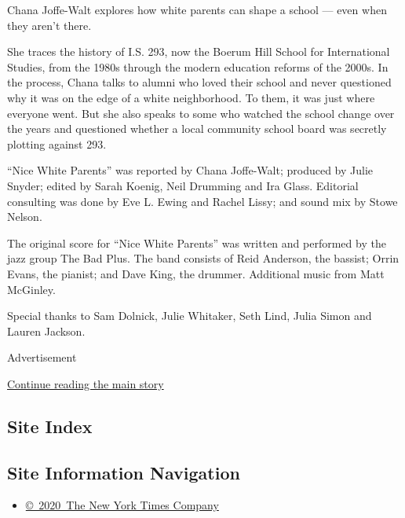 Chana Joffe-Walt explores how white parents can shape a school --- even
when they aren't there.

She traces the history of I.S. 293, now the Boerum Hill School for
International Studies, from the 1980s through the modern education
reforms of the 2000s. In the process, Chana talks to alumni who loved
their school and never questioned why it was on the edge of a white
neighborhood. To them, it was just where everyone went. But she also
speaks to some who watched the school change over the years and
questioned whether a local community school board was secretly plotting
against 293.

``Nice White Parents'' was reported by Chana Joffe-Walt; produced by
Julie Snyder; edited by Sarah Koenig, Neil Drumming and Ira Glass.
Editorial consulting was done by Eve L. Ewing and Rachel Lissy; and
sound mix by Stowe Nelson.

The original score for ``Nice White Parents'' was written and performed
by the jazz group The Bad Plus. The band consists of Reid Anderson, the
bassist; Orrin Evans, the pianist; and Dave King, the drummer.
Additional music from Matt McGinley.

Special thanks to Sam Dolnick, Julie Whitaker, Seth Lind, Julia Simon
and Lauren Jackson.

Advertisement

\protect\hyperlink{after-bottom}{Continue reading the main story}

\hypertarget{site-index}{%
\subsection{Site Index}\label{site-index}}

\hypertarget{site-information-navigation}{%
\subsection{Site Information
Navigation}\label{site-information-navigation}}

\begin{itemize}
\tightlist
\item
  \href{https://help.nytimes3xbfgragh.onion/hc/en-us/articles/115014792127-Copyright-notice}{©~2020~The
  New York Times Company}
\end{itemize}


